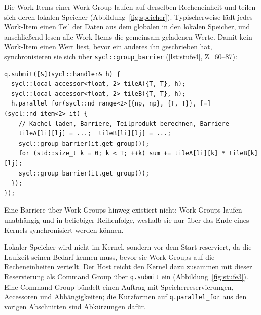 \documentclass[12pt,a4paper]{article}
\newcommand{\stelle}[2]{(\hyperref[#1]{\ref*{#1}, Z.~#2})}
\begin{document}
Die Work-Items einer Work-Group laufen auf derselben Recheneinheit und teilen
sich deren lokalen Speicher (Abbildung~\ref{fig:speicher}). Typischerweise lädt
jedes Work-Item einen Teil der Daten aus dem globalen in den lokalen Speicher,
und anschließend lesen alle Work-Items die gemeinsam geladenen Werte. Damit kein
Work-Item einen Wert liest, bevor ein anderes ihn geschrieben hat,
synchronisieren sie sich über \texttt{sycl::\allowbreak group\_\allowbreak barrier}
\stelle{lst:stufe4}{60--87}:

\begin{lstlisting}
q.submit([&](sycl::handler& h) {
  sycl::local_accessor<float, 2> tileA({T, T}, h);
  sycl::local_accessor<float, 2> tileB({T, T}, h);
  h.parallel_for(sycl::nd_range<2>{{np, np}, {T, T}}, [=](sycl::nd_item<2> it) {
    // Kachel laden, Barriere, Teilprodukt berechnen, Barriere
    tileA[li][lj] = ...;  tileB[li][lj] = ...;
    sycl::group_barrier(it.get_group());
    for (std::size_t k = 0; k < T; ++k) sum += tileA[li][k] * tileB[k][lj];
    sycl::group_barrier(it.get_group());
  });
});
\end{lstlisting}

\noindent Eine Barriere über Work-Groups hinweg existiert nicht: Work-Groups
laufen unabhängig und in beliebiger Reihenfolge, weshalb sie nur über das Ende
eines Kernels synchronisiert werden können.

Lokaler Speicher wird nicht im Kernel, sondern vor dem Start reserviert, da die
Laufzeit seinen Bedarf kennen muss, bevor sie Work-Groups auf die
Recheneinheiten verteilt. Der Host reicht den Kernel dazu zusammen mit dieser
Reservierung als Command Group über \texttt{q.submit} ein
(Abbildung~\ref{fig:stufe3}). Eine Command Group bündelt einen Auftrag mit
Speicherreservierungen, Accessoren und Abhängigkeiten; die Kurzformen auf
\texttt{q.parallel\_for} aus den vorigen Abschnitten sind Abkürzungen dafür.
\end{document}
